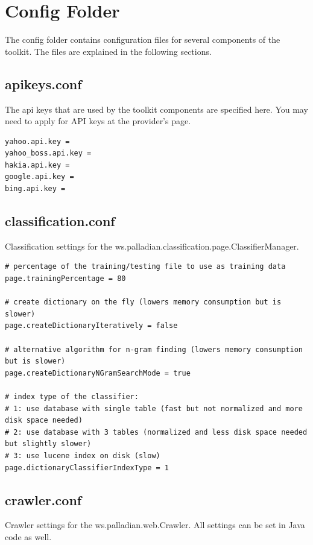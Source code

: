 \documentclass[a4paper,twoside]{book}      %
\begin{document}
\section{Config Folder}


\label{sec:config.conf}
The config folder contains configuration files for several components of the toolkit. The files are explained in the following sections.

\subsection{apikeys.conf}
\label{sec:apikeys.conf}
The api keys that are used by the toolkit components are specified here. You may need to apply for API keys at the provider's page.

\begin{verbatim}
yahoo.api.key = 
yahoo_boss.api.key = 
hakia.api.key = 
google.api.key = 
bing.api.key = 
\end{verbatim}

\subsection{classification.conf}
\label{sec:classification.conf}
Classification settings for the ws.palladian.classification.page.ClassifierManager.

\begin{verbatim}
# percentage of the training/testing file to use as training data
page.trainingPercentage = 80

# create dictionary on the fly (lowers memory consumption but is slower)
page.createDictionaryIteratively = false

# alternative algorithm for n-gram finding (lowers memory consumption but is slower)
page.createDictionaryNGramSearchMode = true

# index type of the classifier:
# 1: use database with single table (fast but not normalized and more disk space needed)
# 2: use database with 3 tables (normalized and less disk space needed but slightly slower)
# 3: use lucene index on disk (slow)
page.dictionaryClassifierIndexType = 1
\end{verbatim}

\subsection{crawler.conf}
\label{sec:crawler.conf}
Crawler settings for the ws.palladian.web.Crawler. All settings can be set in Java code as well.
\end{document}
